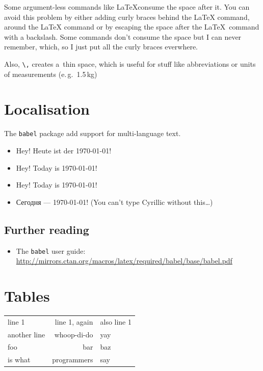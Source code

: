 \documentclass{scrartcl}
\begin{document}
Some argument-less commands like \LaTeX consume the space after it.
You can avoid this problem by either adding curly braces behind the \LaTeX{}
command, around the {\LaTeX} command or by escaping the space after the
\LaTeX\ command with a backslash.
Some commands don't consume the space but I can never remember, which, so I just
put all the curly braces everwhere.

Also, \texttt{\textbackslash,} creates a~thin space, which is useful for stuff
like abbreviations or units of measurements (e.\,g.\ 1.5\,kg)

\section{Localisation}

The \texttt{babel} package add support for multi-language text.

\begin{itemize}
  \item {Hey! Heute ist der \today!}
  \item {Hey! Today is \today!}
  \item {Hey! Today is \today!}
  \item {Сегодня --- \today!}
    (You can't type Cyrillic without this\dots)
\end{itemize}

\subsection*{Further reading}

\begin{itemize}
  \item The \texttt{babel} user guide: \\
    \url{http://mirrors.ctan.org/macros/latex/required/babel/base/babel.pdf}
\end{itemize}

\section{Tables}

\begin{center}
  \begin{tabular}{lrl}
    line 1 & line 1, again & also line 1 \\
    another line & whoop-di-do & yay \\
    foo & bar & baz \\
    is what & programmers & say \\
  \end{tabular}
\end{center}
\end{document}
